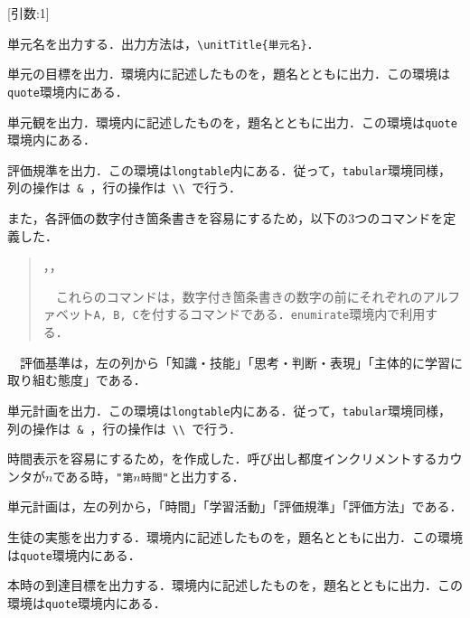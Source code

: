 \documentclass[paper=a4,fontsize=10.5pt]{jlreq}
\begin{document}
\noindent\ovalbox{\verb|\unitTitle|} [引数:1]\par
単元名を出力する．出力方法は，\verb|\unitTitle{単元名}|．\\
\noindent{}\par
単元の目標を出力．環境内に記述したものを，題名とともに出力．この環境は\verb|quote|環境内にある．\\
\par
単元観を出力．環境内に記述したものを，題名とともに出力．この環境は\verb|quote|環境内にある．\\
\par
評価規準を出力．この環境は\verb|longtable|内にある．従って，\verb|tabular|環境同様，列の操作は\verb| & |，行の操作は\verb| \\ |で行う．\par
また，各評価の数字付き箇条書きを容易にするため，以下の3つのコマンドを定義した．
\begin{quote}
    \noindent\ovalbox{\verb|\enumiA|}，\ovalbox{\verb|\enumiB|}，\ovalbox{\verb|\enumiC|}\par
    \ \ これらのコマンドは，数字付き箇条書きの数字の前にそれぞれのアルファベット\verb|A, B, C|を付するコマンドである．\verb|enumirate|環境内で利用する．
\end{quote}
\ \ 評価基準は，左の列から「知識・技能」「思考・判断・表現」「主体的に学習に取り組む態度」である．\\
\par
単元計画を出力．この環境は\verb|longtable|内にある．従って，\verb|tabular|環境同様，列の操作は\verb| & |，行の操作は\verb| \\ |で行う．\par
時間表示を容易にするため，\ovalbox{\verb|\timeCount|}を作成した．呼び出し都度インクリメントするカウンタが\(n\)である時，\verb|"第|\(n\)\verb|時間"|と出力する．\par
単元計画は，左の列から，「時間」「学習活動」「評価規準」「評価方法」である．\\
\par
生徒の実態を出力する．環境内に記述したものを，題名とともに出力．この環境は\verb|quote|環境内にある．\\
\par
本時の到達目標を出力する．環境内に記述したものを，題名とともに出力．この環境は\verb|quote|環境内にある．\\
\end{document}
